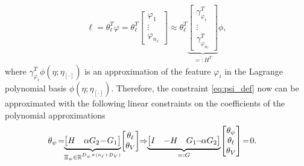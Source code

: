 \begin{align*}
\ell = \theta_\ell^T\varphi =\theta_\ell^T
\begin{bmatrix}
\varphi_1\\\vdots\\\varphi_{n_\ell}
\end{bmatrix}
\approx \theta_\ell^T
\underbrace{\begin{bmatrix}
\gamma_{\varphi_1}^T\\\vdots\\\gamma_{\varphi_{n_\ell}}^T
\end{bmatrix}}_{=: H^T}\phi,
\end{align*}
where $\gamma_{\varphi_i}^T\phi(\eta;\eta_{[\cdot]})$ is an approximation of the feature $\varphi_i$ in the Lagrange polynomial basis $\phi(\eta;\eta_{[\cdot]})$.
Therefore, the constraint \eqref{eq:psi_def} now can be approximated with the following linear constraints on the coefficients of the polynomial approximations
\begin{align}
    &\theta_\psi\!=\!\! \underbrace{\begin{bmatrix}H &\alpha G_2\!-\!G_1\end{bmatrix}}_{\Xi_\psi \in \mR^{D_\psi\times (n_\ell + D_V)}}\! \begin{bmatrix}
        \theta_\ell\\\theta_V
    \end{bmatrix}\!\!\Rightarrow\!\!
    \underbrace{\begin{bmatrix}
    I &-H &G_1\!\!-\!\!\alpha G_2
    \end{bmatrix}}_{=: G}\!
    \begin{bmatrix}
    \theta_\psi \\\theta_\ell \\ \theta_V
    \end{bmatrix}\!=\!0.\label{eq:psi_ell_V_equality_constraint}
\end{align}



